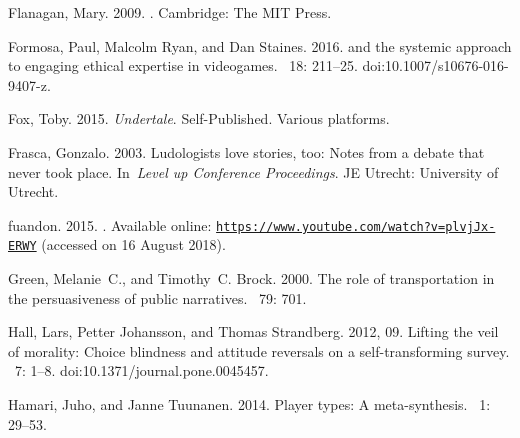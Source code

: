\documentclass[arts,article,accept,moreauthors,pdftex,10pt,a4paper]{Definitions/mdpi}
\begin{document}
\begin{thebibliography}{999}
Flanagan, Mary. 2009.
.
\newblock Cambridge: The MIT Press.

Formosa, Paul, Malcolm Ryan, and Dan Staines. 2016.
 and the systemic approach to engaging ethical
  expertise in videogames.
~{18\/}: 211--25.
\newblock
  doi:10.1007/s10676-016-9407-z.

Fox, Toby. 2015.
\newblock \emph{Undertale}.
\newblock Self-Published.
\newblock Various platforms.


Frasca, Gonzalo. 2003. 
\newblock Ludologists love stories, too: Notes from a debate that never took
  place.
\newblock In~{\em Level up Conference Proceedings}. JE Utrecht: University of Utrecht.


fuandon. 2015.%
.
\newblock Available online:
  \href{https://www.youtube.com/watch?v=plvjJx-ERWY}{\nolinkurl{https://www.youtube.com/watch?v=plvjJx-ERWY}}
    (accessed on 16 August 2018).

Green, Melanie~C., and Timothy~C. Brock. 2000.
\newblock The role of transportation in the persuasiveness of public
  narratives.
~{79\/}: 701.

Hall, Lars, Petter Johansson, and Thomas Strandberg. 2012, 09.
\newblock Lifting the veil of morality: {Choice} blindness and attitude
  reversals on a self-transforming survey.
~{7\/}: 1--8.
\newblock
  doi:10.1371/journal.pone.0045457.

Hamari, Juho, and Janne Tuunanen. 2014.
\newblock Player types: A meta-synthesis.
~1: {29--53\/}.%


\end{thebibliography}
\end{document}
